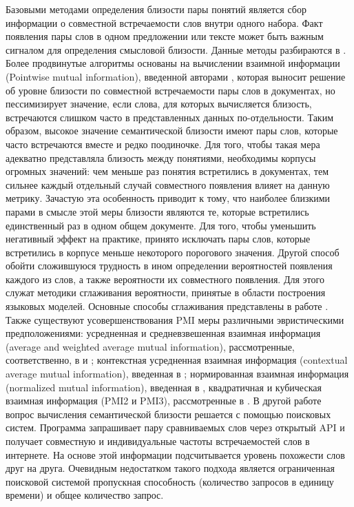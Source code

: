 Базовыми методами определения близости пары понятий является сбор информации о совместной встречаемости слов внутри одного набора. Факт появления пары слов в одном предложении или тексте может быть важным сигналом для определения смысловой близости. Данные методы разбираются в \cite{freq_1,freq_2,pmi}. Более продвинутые алгоритмы основаны на вычислении взаимной информации (Pointwise mutual information), введенной авторами \cite{pmi}, которая выносит решение об уровне близости по совместной встречаемости пары слов в документах, но пессимизирует значение, если слова, для которых вычисляется близость, встречаются слишком часто в представленных данных по-отдельности. Таким образом, высокое значение семантической близости имеют пары слов, которые часто встречаются вместе и редко поодиночке. Для того, чтобы такая мера адекватно представляла близость между понятиями, необходимы корпусы огромных значений: чем меньше раз понятия встретились в документах, тем сильнее каждый отдельный случай совместного появления влияет на данную метрику. Зачастую эта особенность приводит к тому, что наиболее близкими парами в смысле этой меры близости являются те, которые встретились единственный раз в одном общем документе. Для того, чтобы уменьшить негативный эффект на практике, принято исключать пары слов, которые встретились в корпусе меньше некоторого порогового значения. Другой способ обойти сложившуюся трудность в ином определении вероятностей появления каждого из слов, а также вероятности их совместного появления. Для этого служат методики сглаживания вероятности, принятые в области построения языковых моделей. Основные способы сглаживания представлены в работе \cite{lm}. Также существуют усовершенствования PMI меры различными эвристическими предположениями: усредненная и средневзвешенная взаимная информация (average and weighted average mutual information), рассмотренные, соответственно, в \cite{avg_pmi} и \cite{w_avg_pmi}; контекстная усредненная взаимная информация (contextual average mutual information), введенная в \cite{context_pmi}; нормированная взаимная информация (normalized mutual information), введенная в \cite{npmi}, квадратичная и кубическая взаимная информация (PMI2 и PMI3), рассмотренные в \cite{pmi23}. 
В другой работе \cite{search_eng} вопрос вычисления семантической близости решается с помощью поисковых систем. Программа запрашивает пару сравниваемых слов через открытый API и получает совместную и индивидуальные частоты встречаемостей слов в интернете. На основе этой информации подсчитывается уровень похожести слов друг на друга. Очевидным недостатком такого подхода является ограниченная поисковой системой пропускная способность (количество запросов в единицу времени) и общее количество запрос.

